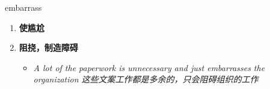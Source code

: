 
\begin{frame}
{\huge embarrass}
\begin{center}
\begin{enumerate}\Large
  \item \textbf{使尴尬}
  \item \textbf{阻挠，制造障碍}
  \begin{itemize}
    \item \em{\Large{A lot of the paperwork is unnecessary and just embarrasses the organization 这些文案工作都是多余的，只会阻碍组织的工作}}
  \end{itemize}
\end{enumerate}
\end{center}
\end{frame}
